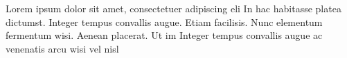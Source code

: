 \documentclass[11pt,a4paper]{article}
\begin{document}
Lorem ipsum dolor sit amet, consectetuer adipiscing eli In hac habitasse platea dictumst. Integer tempus convallis augue. 
Etiam facilisis. Nunc elementum fermentum wisi. Aenean placerat. Ut im  Integer tempus convallis augue
ac venenatis arcu wisi vel nisl  

{



}
\end{document}
